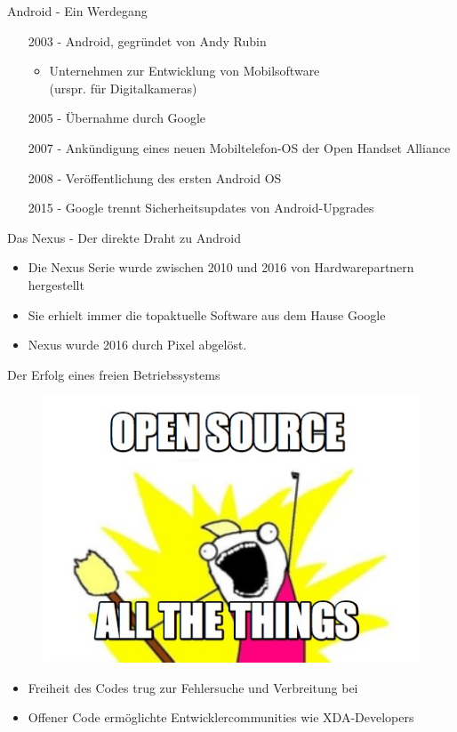 
\begin{frame}{Android - Ein Werdegang}
	\begin{itemize}[<+->]
		\item[2003 -] Android, gegründet von Andy Rubin
		\begin{itemize}	
			\item<1-> Unternehmen zur Entwicklung von Mobilsoftware \\(urspr. für Digitalkameras)
		\end{itemize}
		\item[2005 -] Übernahme durch Google
		\item[2007 -] Ankündigung eines neuen Mobiltelefon-OS der Open Handset Alliance
		\item[2008 -] Veröffentlichung des ersten Android OS
		\item[2015 -] Google trennt Sicherheitsupdates von Android-Upgrades
	\end{itemize}
\end{frame}

\begin{frame}{Das Nexus - Der direkte Draht zu Android}
	\begin{itemize}[<+->]
		\item Die Nexus Serie wurde zwischen 2010 und 2016 von Hardwarepartnern hergestellt
		\item Sie erhielt immer die topaktuelle Software aus dem Hause Google
		\item Nexus wurde 2016 durch Pixel abgelöst.
	\end{itemize}
\end{frame}

\begin{frame}{Der Erfolg eines freien Betriebssystems}
	\begin{figure}
		\includegraphics[scale=0.35]{resources/att.jpg}
	\end{figure}
	\begin{itemize}[<+->]
		\item Freiheit des Codes trug zur Fehlersuche und Verbreitung bei
		\item Offener Code ermöglichte Entwicklercommunities wie XDA-Developers
	\end{itemize}
\end{frame}

